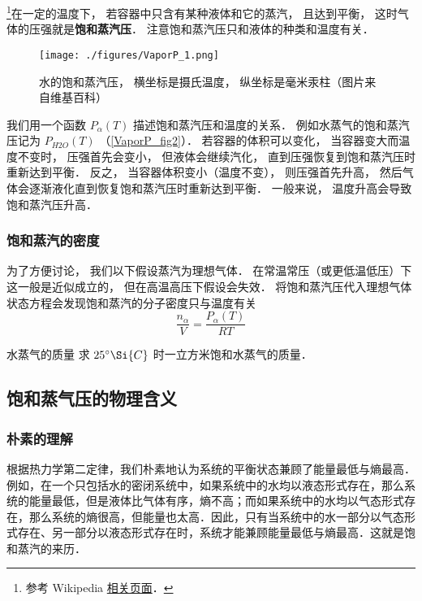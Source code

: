

\footnote{参考 Wikipedia \href{https://en.wikipedia.org/wiki/Vapor_pressure}{相关页面}．}在一定的温度下， 若容器中只含有某种液体和它的蒸汽， 且达到平衡， 这时气体的压强就是\textbf{饱和蒸汽压}． 注意饱和蒸汽压只和液体的种类和温度有关．

\begin{figure}[ht]
\centering
\texttt{[image: ./figures/VaporP\_1.png]}
\caption{水的饱和蒸汽压， 横坐标是摄氏温度， 纵坐标是毫米汞柱（图片来自维基百科）} \label{VaporP_fig2}
\end{figure}

我们用一个函数 $P_\alpha(T)$ 描述饱和蒸汽压和温度的关系． 例如水蒸气的饱和蒸汽压记为 $P_{H2O}(T)$ （\autoref{VaporP_fig2}）． 若容器的体积可以变化， 当容器变大而温度不变时， 压强首先会变小， 但液体会继续汽化， 直到压强恢复到饱和蒸汽压时重新达到平衡． 反之， 当容器体积变小（温度不变）， 则压强首先升高，  然后气体会逐渐液化直到恢复饱和蒸汽压时重新达到平衡． 一般来说， 温度升高会导致饱和蒸汽压升高．

\subsubsection{饱和蒸汽的密度}
为了方便讨论， 我们以下假设蒸汽为理想气体． 在常温常压（或更低温低压）下这一般是近似成立的， 但在高温高压下假设会失效． 将饱和蒸汽压代入理想气体状态方程会发现饱和蒸汽的分子密度只与温度有关
\begin{equation}\label{VaporP_eq2}
\frac{n_\alpha}{V}  = \frac{P_\alpha(T)}{R T}
\end{equation}

\begin{exercise}{水蒸气的质量}
求 $25^\circ\Si{C}$ 时一立方米饱和水蒸气的质量．
\end{exercise}

\subsection{饱和蒸气压的物理含义}
\subsubsection{朴素的理解}
根据热力学第二定律，我们朴素地认为系统的平衡状态兼顾了能量最低与熵最高．例如，在一个只包括水的密闭系统中，如果系统中的水均以液态形式存在，那么系统的能量最低，但是液体比气体有序，熵不高；而如果系统中的水均以气态形式存在，那么系统的熵很高，但能量也太高．因此，只有当系统中的水一部分以气态形式存在、另一部分以液态形式存在时，系统才能兼顾能量最低与熵最高．这就是饱和蒸汽的来历．

